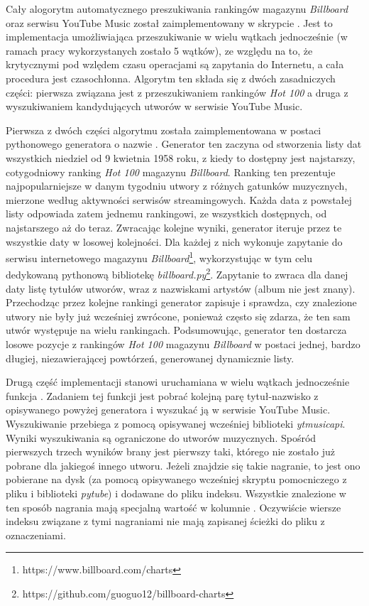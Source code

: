 Cały alogorytm automatycznego preszukiwania rankingów magazynu \emph{Billboard} oraz serwisu YouTube
Music został zaimplementowany w skrypcie . Jest
to implementacja umożliwiająca przeszukiwanie w wielu wątkach jednocześnie (w ramach pracy
wykorzystanych zostało 5 wątków), ze względu na to, że krytycznymi pod wzlędem czasu operacjami są
zapytania do Internetu, a cała procedura jest czasochłonna. Algorytm ten składa się z dwóch
zasadniczych części: pierwsza związana jest z przeszukiwaniem rankingów \emph{Hot 100} a druga z
wyszukiwaniem kandydujących utworów w serwisie YouTube Music.

Pierwsza z dwóch części algorytmu została zaimplementowana w postaci pythonowego generatora o nazwie
. Generator ten zaczyna od stworzenia listy dat wszystkich
niedziel od 9 kwietnia 1958 roku, z kiedy to dostępny jest najstarszy, cotygodniowy ranking
\emph{Hot 100} magazynu \emph{Billboard}. Ranking ten prezentuje najpopularniejsze w danym tygodniu
utwory z różnych gatunków muzycznych, mierzone według aktywności serwisów streamingowych. Każda data
z powstałej listy odpowiada zatem jednemu rankingowi, ze wszystkich dostępnych, od najstarszego aż
do teraz. Zwracając kolejne wyniki, generator iteruje przez te wszystkie daty w losowej kolejności.
Dla każdej z nich wykonuje zapytanie do serwisu internetowego magazynu
\emph{Billboard}\footnote{https://www.billboard.com/charts}, wykorzystując w tym celu dedykowaną
pythonową bibliotekę \emph{billboard.py}\footnote{https://github.com/guoguo12/billboard-charts}.
Zapytanie to zwraca dla danej daty listę tytułów utworów, wraz z nazwiskami artystów (album nie jest
znany). Przechodząc przez kolejne rankingi generator zapisuje i sprawdza, czy znalezione utwory nie
były już wcześniej zwrócone, ponieważ często się zdarza, że ten sam utwór występuje na wielu
rankingach. Podsumowując, generator ten dostarcza losowe pozycje z rankingów \emph{Hot 100} magazynu
\emph{Billboard} w postaci jednej, bardzo długiej, niezawierającej powtórzeń, generowanej
dynamicznie listy.

Drugą część implementacji stanowi uruchamiana w wielu wątkach jednocześnie funkcja
. Zadaniem tej funkcji jest pobrać kolejną parę tytuł-nazwisko z
opisywanego powyżej generatora i wyszukać ją w serwisie YouTube Music. Wyszukiwanie przebiega z
pomocą opisywanej wcześniej biblioteki \emph{ytmusicapi}. Wyniki wyszukiwania są ograniczone do
utworów muzycznych. Spośród pierwszych trzech wyników brany jest pierwszy taki, którego
 nie zostało już pobrane dla jakiegoś innego utworu. Jeżeli znajdzie się takie
nagranie, to jest ono pobierane na dysk (za pomocą opisywanego wcześniej skryptu pomocniczego z
pliku i biblioteki \emph{pytube}) i dodawane do pliku indeksu. Wszystkie znalezione w ten sposób
nagrania mają specjalną wartość  w kolumnie . Oczywiście wiersze
indeksu związane z tymi nagraniami nie mają zapisanej ścieżki do pliku z oznaczeniami.

